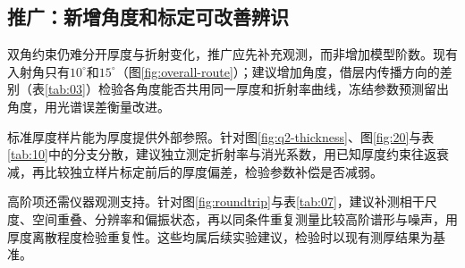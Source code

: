 \subsection{推广：新增角度和标定可改善辨识}
\label{sec:extension}

双角约束仍难分开厚度与折射变化，推广应先补充观测，而非增加模型阶数。现有入射角只有$10^\circ$和$15^\circ$（图\ref{fig:overall-route}）；建议增加角度，借层内传播方向的差别（表\ref{tab:03}）检验各角度能否共用同一厚度和折射率曲线，冻结参数预测留出角度，用光谱误差衡量改进。

标准厚度样片能为厚度提供外部参照。针对图\ref{fig:q2-thickness}、图\ref{fig:20}与表\ref{tab:10}中的分支分散，建议独立测定折射率与消光系数，用已知厚度约束往返衰减，再比较独立样片标定前后的厚度偏差，检验参数补偿是否减弱。

高阶项还需仪器观测支持。针对图\ref{fig:roundtrip}与表\ref{tab:07}，建议补测相干尺度、空间重叠、分辨率和偏振状态，再以同条件重复测量比较高阶谱形与噪声，用厚度离散程度检验重复性。这些均属后续实验建议，检验时以现有测厚结果为基准。
